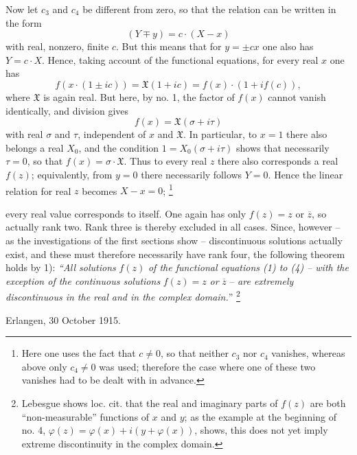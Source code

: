 \documentclass[11pt]{article}
\providecommand{\Xreal}{\mathfrak X}
\providecommand{\srcfn}[2]{%
  \begingroup
  \renewcommand{\thefootnote}{#1}%
  \footnote{#2}%
  \addtocounter{footnote}{-1}%
  \endgroup}
\begin{document}
Now let \(c_3\) and \(c_4\) be different from zero, so that the relation can be written in the form
\[
(Y\mp y)=c\cdot(X-x)
\]
with real, nonzero, finite \(c\). But this means that for \(y=\pm cx\) one also has \(Y=c\cdot X\). Hence, taking account of the functional equations, for every real \(x\) one has
\[
f(x\cdot(1\pm ic))=\Xreal(1+ic)=f(x)\cdot(1+i f(c)),
\]
where \(\Xreal\) is again real. But here, by no. 1, the factor of \(f(x)\) cannot vanish identically, and division gives
\[
f(x)=\Xreal(\sigma+i\tau)
\]
with real \(\sigma\) and \(\tau\), independent of \(x\) and \(\Xreal\). In particular, to \(x=1\) there also belongs a real \(X_0\), and the condition \(1=X_0(\sigma+i\tau)\) shows that necessarily \(\tau=0\), so that \(f(x)=\sigma\cdot\Xreal\). Thus to every real \(z\) there also corresponds a real \(f(z)\); equivalently, from \(y=0\) there necessarily follows \(Y=0\). Hence the linear relation for real \(z\) becomes \(X-x=0\);\srcfn{*)}{Here one uses the fact that \(c\ne0\), so that neither \(c_3\) nor \(c_4\) vanishes, whereas above only \(c_4\ne0\) was used; therefore the case where one of these two vanishes had to be dealt with in advance.} every real value corresponds to itself. One again has only \(f(z)=z\) or \(\overline z\), so actually rank two. Rank three is thereby excluded in all cases. Since, however -- as the investigations of the first sections show -- discontinuous solutions actually exist, and these must therefore necessarily have rank four, the following theorem holds by 1): \emph{``All solutions} \(f(z)\) \emph{of the functional equations (1) to (4) -- with the exception of the continuous solutions} \(f(z)=z\) \emph{or} \(\overline z\) -- \emph{are extremely discontinuous in the real and in the complex domain.}''\srcfn{**)}{Lebesgue shows loc. cit. that the real and imaginary parts of \(f(z)\) are both ``non-measurable'' functions of \(x\) and \(y\); as the example at the beginning of no. 4, \(\varphi(z)=\varphi(x)+i(y+\varphi(x))\), shows, this does not yet imply extreme discontinuity in the complex domain.}

\medskip
\noindent Erlangen, 30 October 1915.
\end{document}
